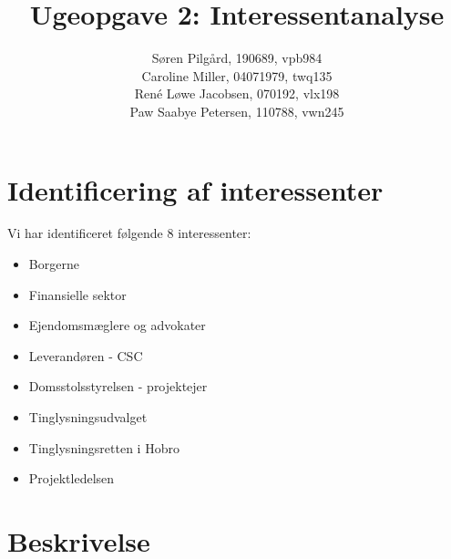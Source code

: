 \documentclass[10pt,a4paper,danish]{article}
\title{Ugeopgave 2: Interessentanalyse}
\author{Søren Pilgård, 190689, vpb984\\
Caroline Miller, 04071979, twq135\\
René Løwe Jacobsen, 070192, vlx198\\
Paw Saabye Petersen, 110788, vwn245}
\begin{document}
\maketitle
\newpage


\section{Identificering af interessenter}





Vi har identificeret følgende 8 interessenter:
\begin{itemize}
\item Borgerne
\item Finansielle sektor
\item Ejendomsmæglere og advokater
\item Leverandøren - CSC
\item Domsstolsstyrelsen - projektejer
\item Tinglysningsudvalget
\item Tinglysningsretten i Hobro
\item Projektledelsen
\end{itemize}

\section{Beskrivelse}
\end{document}
